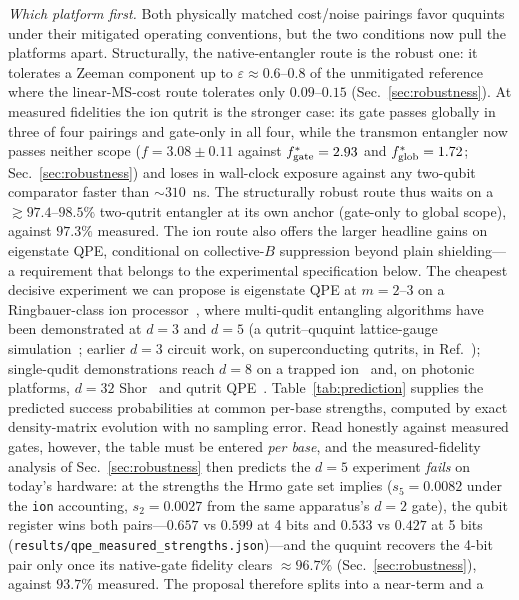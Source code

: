\documentclass[aps,pra,reprint,superscriptaddress,nofootinbib,floatfix]{revtex4-2}
\begin{document}
\emph{Which platform first.} Both physically matched cost/noise
pairings favor ququints under their mitigated operating conventions,
but the two conditions now pull the platforms apart.
Structurally, the native-entangler route is the robust one: it
tolerates a Zeeman component up to $\varepsilon\approx0.6$--$0.8$ of
the unmitigated reference where the linear-MS-cost route tolerates
only $0.09$--$0.15$ (Sec.~\ref{sec:robustness}). At measured
fidelities the ion qutrit is the stronger case: its gate passes
globally in three of four pairings and gate-only in all four,
while the transmon entangler now passes neither scope
($f=3.08\pm0.11$ against $f^\ast_{\rm gate}=2.93$ and
$f^\ast_{\rm glob}=1.72$; Sec.~\ref{sec:robustness}) and loses in
wall-clock exposure against any two-qubit comparator faster than
${\sim}310$~ns. The structurally robust route thus waits on a
${\gtrsim}97.4$--$98.5\%$ two-qutrit entangler at its own anchor
(gate-only to global scope), against $97.3\%$ measured. The
ion route also offers the larger headline gains on eigenstate QPE,
conditional on collective-$B$ suppression beyond plain shielding---a
requirement that belongs to the experimental specification below. The cheapest
decisive experiment we can propose is eigenstate QPE at $m=2$--$3$ on
a Ringbauer-class ion processor~\cite{ringbauer2022}, where
multi-qudit entangling algorithms have been demonstrated at $d=3$ and
$d=5$ (a qutrit--ququint lattice-gauge simulation~\cite{meth2025};
earlier $d=3$ circuit work, on superconducting qutrits, in
Ref.~\cite{roy2022});
single-qudit demonstrations reach $d=8$ on a trapped
ion~\cite{shi2025} and, on photonic platforms, $d=32$
Shor~\cite{weng2024} and qutrit QPE~\cite{lu2020}. Table~\ref{tab:prediction} supplies the
predicted success probabilities at common per-base strengths,
computed by exact density-matrix evolution with no sampling error.
Read honestly against measured gates, however, the table must be
entered \emph{per base}, and the measured-fidelity analysis of
Sec.~\ref{sec:robustness} then predicts the $d=5$ experiment
\emph{fails} on today's hardware: at the strengths the Hrmo gate set
implies ($s_5=0.0082$ under the \texttt{ion} accounting,
$s_2=0.0027$ from the same apparatus's
$d=2$ gate), the qubit register wins both pairs---$0.657$ vs $0.599$
at 4 bits and $0.533$ vs $0.427$ at 5 bits
(\texttt{results/qpe\_measured\_strengths.json})---and the ququint
recovers the 4-bit pair only once its native-gate fidelity clears
${\approx}96.7\%$ (Sec.~\ref{sec:robustness}), against $93.7\%$
measured. The proposal therefore splits into a near-term and a
\end{document}
